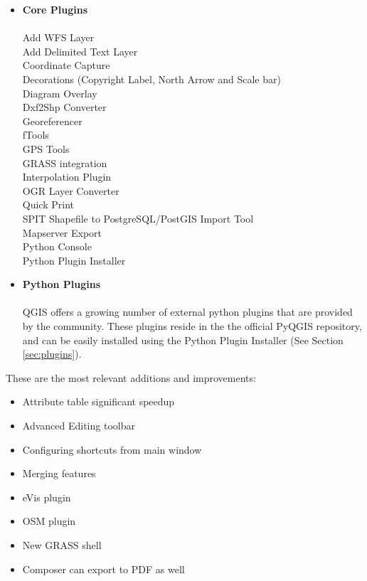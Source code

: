 \begin{itemize}
\item \textbf{Core Plugins}
\\ \\ Add WFS Layer
\\ Add Delimited Text Layer
\\ Coordinate Capture
\\ Decorations (Copyright Label, North Arrow and Scale bar)
\\ Diagram Overlay
\\ Dxf2Shp Converter
\\ Georeferencer
\\ fTools
\\ GPS Tools
\\ GRASS integration
\\ Interpolation Plugin
\\ OGR Layer Converter
\\ Quick Print
\\ SPIT Shapefile to PostgreSQL/PostGIS Import Tool
\\ Mapserver Export
\\ Python Console
\\ Python Plugin Installer
\\ \item \textbf{Python Plugins}
\\ \\ QGIS offers a growing number of external python plugins that are 
provided by the
community. These plugins reside in the the official
PyQGIS repository, and can be easily installed using the Python Plugin 
Installer (See Section \ref{sec:plugins}).
\end{itemize}


These are the most relevant additions and improvements:
\begin{itemize}
 \item Attribute table significant speedup
 \item Advanced Editing toolbar
 \item Configuring shortcuts from main window
 \item Merging features 
 \item eVis plugin
 \item OSM plugin 
 \item New GRASS shell
 \item Composer can export to PDF as well

\end{itemize}


